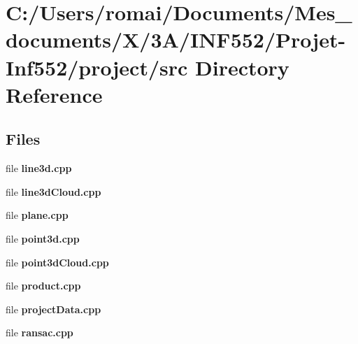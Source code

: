 \section{C\+:/\+Users/romai/\+Documents/\+Mes\+\_\+documents/\+X/3\+A/\+I\+N\+F552/\+Projet-\/\+Inf552/project/src Directory Reference}
\label{dir_f77a644fded742ea05ed17fa0fdf6fe1}
\subsection*{Files}
\begin{DoxyCompactItemize}
\item 
file \textbf{ line3d.\+cpp}
\item 
file \textbf{ line3d\+Cloud.\+cpp}
\item 
file \textbf{ plane.\+cpp}
\item 
file \textbf{ point3d.\+cpp}
\item 
file \textbf{ point3d\+Cloud.\+cpp}
\item 
file \textbf{ product.\+cpp}
\item 
file \textbf{ project\+Data.\+cpp}
\item 
file \textbf{ ransac.\+cpp}
\end{DoxyCompactItemize}
